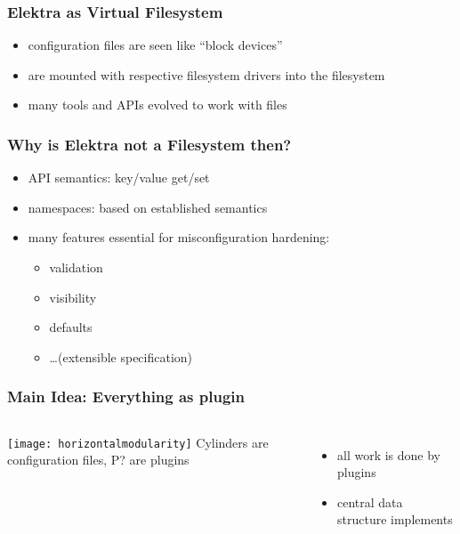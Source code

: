 \begin{frame}
	\frametitle{Elektra as Virtual Filesystem}
	\begin{itemize}
	\item configuration files are seen like ``block devices''
	\item are mounted with respective filesystem drivers into the filesystem
	\item many tools and APIs evolved to work with files
	\end{itemize}
\end{frame}

\begin{frame}
	\frametitle{Why is Elektra not a Filesystem then?}
	\begin{itemize}
	\item API semantics: key/value get/set
	\item namespaces: based on established semantics
	\item many features essential for misconfiguration hardening:
		\begin{itemize}
		\item validation
		\item visibility
		\item defaults
		\item \dots (extensible specification)
		\end{itemize}
	\end{itemize}
\end{frame}

\begin{frame}
\end{frame}

\begin{frame}
	\frametitle{Main Idea: Everything as plugin}
	\begin{columns}[c]
	\column{7cm}
	\texttt{[image: horizontalmodularity]}
	\column{4cm}
	Cylinders are configuration files, P? are plugins~\cite{raab2016improving}

	\begin{itemize}
	\item all work is done by plugins
	\item central data structure implements 
	\end{itemize}
	\end{columns}
\end{frame}


